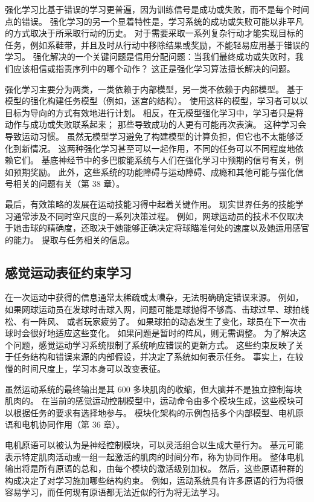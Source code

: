 强化学习比基于错误的学习更普遍，因为训练信号是成功或失败，而不是每个时间点的错误。 强化学习的另一个显着特性是，学习系统的成功或失败可能以非平凡的方式取决于所采取行动的历史。 对于需要采取一系列复杂行动才能实现目标的任务，例如系鞋带，并且及时从行动中移除结果或奖励，不能轻易应用基于错误的学习。 强化解决的一个关键问题是信用分配问题：当我们最终成功或失败时，我们应该相信或指责序列中的哪个动作？ 这正是强化学习算法擅长解决的问题。

强化学习主要分为两类，一类依赖于内部模型，另一类不依赖于内部模型。 基于模型的强化构建任务模型（例如，迷宫的结构）。 使用这样的模型，学习者可以以目标为导向的方式有效地进行计划。 相反，在无模型强化学习中，学习者只是将动作与成功或失败联系起来； 那些导致成功的人更有可能再次表演。 这种学习会导致运动习惯。 虽然无模型学习避免了构建模型的计算负担，但它也不太能够泛化到新情况。 这两种强化学习甚至可以一起作用，不同的任务可以不同程度地依赖它们。 基底神经节中的多巴胺能系统与人们在强化学习中预期的信号有关，例如预期奖励。 此外，这些系统的功能障碍与运动障碍、成瘾和其他可能与强化信号相关的问题有关（第 38 章）。

最后，有效策略的发展在运动技能习得中起着关键作用。 现实世界任务的技能学习通常涉及不同时空尺度的一系列决策过程。 例如，网球运动员的技术不仅取决于她击球的精确度，还取决于她能够正确决定将球瞄准何处的速度以及她运用感官的能力。 提取与任务相关的信息。

\subsection{感觉运动表征约束学习}
在一次运动中获得的信息通常太稀疏或太嘈杂，无法明确确定错误来源。 例如，如果网球运动员在发球时击球入网，问题可能是球抛得不够高、击球过早、球拍线松、有一阵风、 或者玩家疲劳了。 如果球拍的动态发生了变化，球员在下一次击球时会很好地适应这些变化。 如果问题是暂时的阵风，则无需调整。 为了解决这个问题，感觉运动学习系统限制了系统响应错误的更新方式。 这些约束反映了关于任务结构和错误来源的内部假设，并决定了系统如何表示任务。 事实上，在较慢的时间尺度上，学习本身可以改变表征。

虽然运动系统的最终输出是其 600 多块肌肉的收缩，但大脑并不是独立控制每块肌肉的。 在当前的感觉运动控制模型中，运动命令由多个模块生成，这些模块可以根据任务的要求有选择地参与。 模块化架构的示例包括多个内部模型、电机原语和电机协同作用（第 36 章）。

电机原语可以被认为是神经控制模块，可以灵活组合以生成大量行为。 基元可能表示特定肌肉活动或一组一起激活的肌肉的时间分布，称为协同作用。 整体电机输出将是所有原语的总和，由每个模块的激活级别加权。 然后，这些原语种群的构成决定了对学习施加哪些结构约束。 例如，运动系统具有许多原语的行为将很容易学习，而任何现有原语都无法近似的行为将无法学习。


